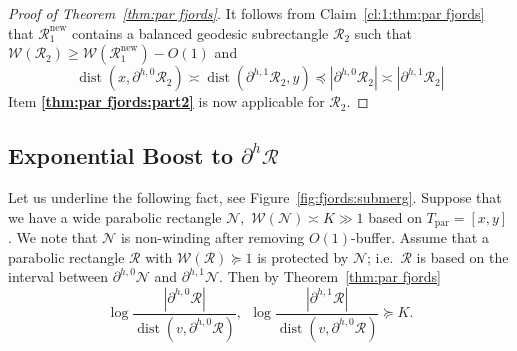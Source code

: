\documentclass{amsart}
\renewcommand{\sp}{{\ \ }}
\newcommand{\1}{{\mathbb 1 }}
\newcommand{\Width}{{\mathcal W}}
\newcommand\NN{\mathcal{N}}
\newcommand\RR{\mathcal{R}}
\newcommand\parab{{\operatorname{par}}}
\newcommand\new{{\operatorname{new}}}
\theoremstyle{remark}
\numberwithin{equation}{section}
\theoremstyle{definition}
\newcommand{\dist}{\operatorname{dist}}
\begin{document}
\begin{proof}[Proof of Theorem~\ref{thm:par fjords}]
It follows from Claim~\ref{cl:1:thm:par fjords} that $\RR_1^\new$ contains a balanced geodesic subrectangle $\RR_2$ such that $\Width(\RR_2)\ge \Width(\RR_1^\new)-O(1)$ and
\[ \dist(x,\partial^{h,0}\RR_2) \asymp \dist(\partial^{h,1}\RR_2,y) \preceq |\partial^{h,0}\RR_2| \asymp |\partial^{h,1}\RR_2| \]
 Item {\bf \ref{thm:par fjords:part2}} is now applicable for $\RR_2$.
\end{proof}


\subsection{Exponential Boost to $\partial^h \RR$}\label{ss:ExpBoost} Let us underline the following fact, see Figure~\ref{fig:fjords:submerg}. Suppose that we have a wide parabolic rectangle $\NN,$ $\Width(\NN)\asymp K\gg 1$ based on $T_\parab=[x,y]$. We note that $\NN$ is non-winding after removing $O(1)$-buffer. Assume that a parabolic rectangle $\RR$ with $\Width(\RR)\succeq 1$ is protected by $\NN$; i.e.~$\RR$ is based on the interval between $\partial^{h,0}\NN$ and $\partial^{h,1}\NN$. Then by Theorem~\ref{thm:par fjords}
\begin{equation}
\label{eq:subm rule} \log \frac{|\partial ^{h,0}\RR|}{\dist(v,\partial ^{h,0}\RR)} ,\sp \log \frac{|\partial ^{h,1}\RR|}{\dist(v,\partial ^{h,0}\RR)} \succeq K. 
\end{equation} 
\end{document}
